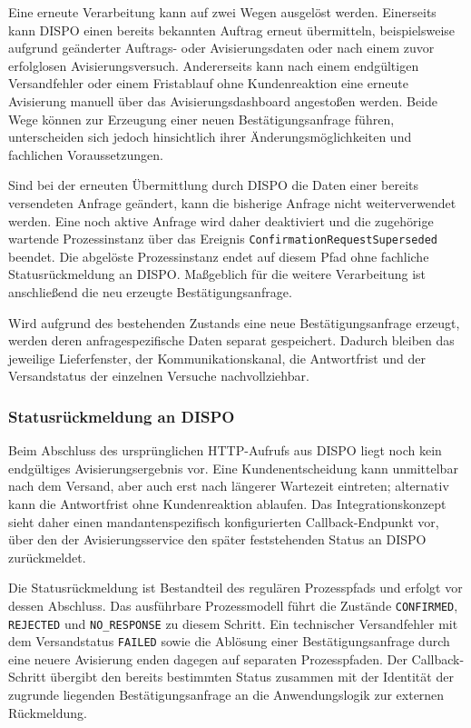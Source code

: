 Eine erneute Verarbeitung kann auf zwei Wegen ausgelöst werden. Einerseits kann
DISPO einen bereits bekannten Auftrag erneut übermitteln, beispielsweise
aufgrund geänderter Auftrags- oder Avisierungsdaten oder nach einem zuvor
erfolglosen Avisierungsversuch. Andererseits kann nach einem endgültigen
Versandfehler oder einem Fristablauf ohne Kundenreaktion eine erneute Avisierung
manuell über das Avisierungsdashboard angestoßen werden. Beide Wege können zur
Erzeugung einer neuen Bestätigungsanfrage führen, unterscheiden sich jedoch
hinsichtlich ihrer Änderungsmöglichkeiten und fachlichen Voraussetzungen.

Sind bei der erneuten Übermittlung durch DISPO die Daten einer bereits
versendeten Anfrage geändert, kann die bisherige Anfrage nicht weiterverwendet
werden. Eine noch aktive Anfrage wird daher deaktiviert und die zugehörige
wartende Prozessinstanz über das Ereignis
\texttt{Confirmation\allowbreak{}Request\allowbreak{}Superseded} beendet. Die abgelöste Prozessinstanz
endet auf diesem Pfad ohne fachliche Statusrückmeldung an DISPO. Maßgeblich für
die weitere Verarbeitung ist anschließend die neu erzeugte
Bestätigungsanfrage.

Wird aufgrund des bestehenden Zustands eine neue Bestätigungsanfrage
erzeugt, werden deren anfragespezifische Daten separat gespeichert. Dadurch
bleiben das jeweilige Lieferfenster, der Kommunikationskanal, die Antwortfrist
und der Versandstatus der einzelnen Versuche nachvollziehbar.

\subsubsection{Statusrückmeldung an DISPO}
\label{sec:statusrueckmeldung-dispo}

Beim Abschluss des ursprünglichen HTTP-Aufrufs aus DISPO liegt noch
kein endgültiges Avisierungsergebnis vor. Eine Kundenentscheidung kann unmittelbar
nach dem Versand, aber auch erst nach längerer Wartezeit eintreten; alternativ
kann die Antwortfrist ohne Kundenreaktion ablaufen. Das Integrationskonzept
sieht daher einen mandantenspezifisch konfigurierten Callback-Endpunkt vor, über
den der Avisierungsservice den später feststehenden Status an DISPO
zurückmeldet.

Die Statusrückmeldung ist Bestandteil des regulären Prozesspfads und erfolgt
vor dessen Abschluss. Das ausführbare Prozessmodell führt die Zustände
\texttt{CONFIRMED}, \texttt{REJECTED} und \texttt{NO\_RESPONSE} zu diesem
Schritt. Ein technischer Versandfehler mit dem Versandstatus \texttt{FAILED}
sowie die Ablösung einer Bestätigungsanfrage durch eine neuere Avisierung
enden dagegen auf separaten Prozesspfaden. Der Callback-Schritt übergibt den
bereits bestimmten Status zusammen mit der Identität der zugrunde liegenden
Bestätigungsanfrage an die Anwendungslogik zur externen Rückmeldung.

